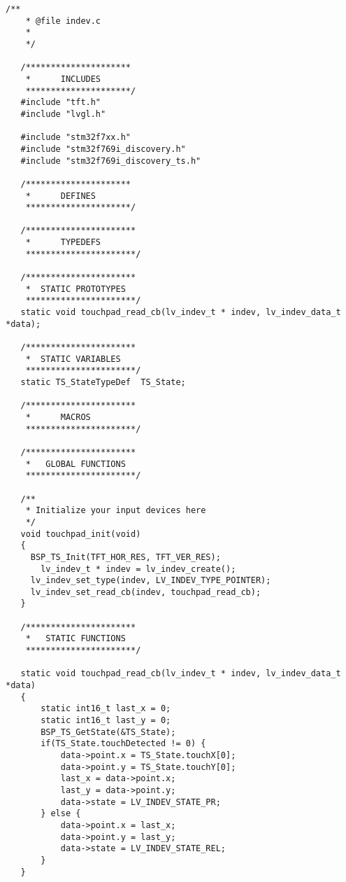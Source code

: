 \begin{lstlisting}[captionpos=t, caption={Fichero \texttt{Touchpad.c}}]
    /**
    * @file indev.c
    *
    */
   
   /*********************
    *      INCLUDES
    *********************/
   #include "tft.h"
   #include "lvgl.h"
   
   #include "stm32f7xx.h"
   #include "stm32f769i_discovery.h"
   #include "stm32f769i_discovery_ts.h"
   
   /*********************
    *      DEFINES
    *********************/
   
   /**********************
    *      TYPEDEFS
    **********************/
   
   /**********************
    *  STATIC PROTOTYPES
    **********************/
   static void touchpad_read_cb(lv_indev_t * indev, lv_indev_data_t *data);
   
   /**********************
    *  STATIC VARIABLES
    **********************/
   static TS_StateTypeDef  TS_State;
   
   /**********************
    *      MACROS
    **********************/
   
   /**********************
    *   GLOBAL FUNCTIONS
    **********************/
   
   /**
    * Initialize your input devices here
    */
   void touchpad_init(void)
   {
     BSP_TS_Init(TFT_HOR_RES, TFT_VER_RES);
       lv_indev_t * indev = lv_indev_create();
     lv_indev_set_type(indev, LV_INDEV_TYPE_POINTER);
     lv_indev_set_read_cb(indev, touchpad_read_cb);
   }
   
   /**********************
    *   STATIC FUNCTIONS
    **********************/
   
   static void touchpad_read_cb(lv_indev_t * indev, lv_indev_data_t *data)
   {
       static int16_t last_x = 0;
       static int16_t last_y = 0;
       BSP_TS_GetState(&TS_State);
       if(TS_State.touchDetected != 0) {
           data->point.x = TS_State.touchX[0];
           data->point.y = TS_State.touchY[0];
           last_x = data->point.x;
           last_y = data->point.y;
           data->state = LV_INDEV_STATE_PR;
       } else {
           data->point.x = last_x;
           data->point.y = last_y;
           data->state = LV_INDEV_STATE_REL;
       }
   }   
\end{lstlisting}